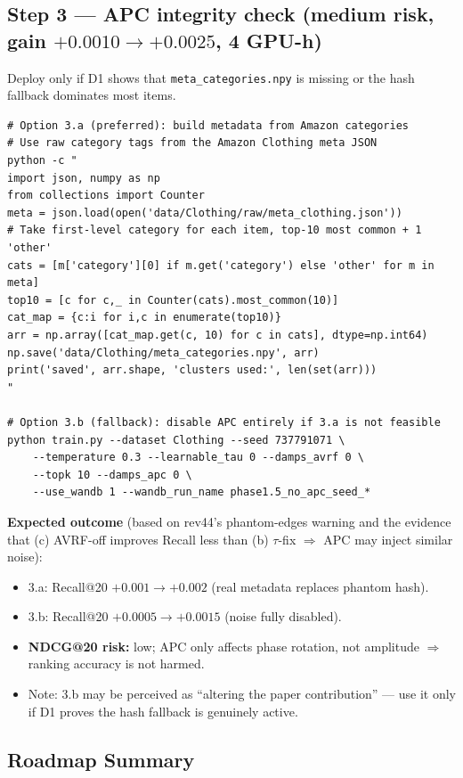 \documentclass[11pt,a4paper]{article}
\begin{document}
\subsection*{Step 3 --- APC integrity check (medium risk, gain $+0.0010 \to +0.0025$, 4 GPU-h)}

Deploy only if D1 shows that \texttt{meta\_categories.npy} is missing or the
hash fallback dominates most items.

\begin{lstlisting}[style=bashstyle]
# Option 3.a (preferred): build metadata from Amazon categories
# Use raw category tags from the Amazon Clothing meta JSON
python -c "
import json, numpy as np
from collections import Counter
meta = json.load(open('data/Clothing/raw/meta_clothing.json'))
# Take first-level category for each item, top-10 most common + 1 'other'
cats = [m['category'][0] if m.get('category') else 'other' for m in meta]
top10 = [c for c,_ in Counter(cats).most_common(10)]
cat_map = {c:i for i,c in enumerate(top10)}
arr = np.array([cat_map.get(c, 10) for c in cats], dtype=np.int64)
np.save('data/Clothing/meta_categories.npy', arr)
print('saved', arr.shape, 'clusters used:', len(set(arr)))
"

# Option 3.b (fallback): disable APC entirely if 3.a is not feasible
python train.py --dataset Clothing --seed 737791071 \
    --temperature 0.3 --learnable_tau 0 --damps_avrf 0 \
    --topk 10 --damps_apc 0 \
    --use_wandb 1 --wandb_run_name phase1.5_no_apc_seed_*
\end{lstlisting}

\textbf{Expected outcome} (based on rev44's phantom-edges warning and the
evidence that (c) AVRF-off improves Recall less than (b) $\tau$-fix
$\Rightarrow$ APC may inject similar noise):
\begin{itemize}[leftmargin=*]
    \item 3.a: Recall@20 $+0.001 \to +0.002$ (real metadata replaces phantom hash).
    \item 3.b: Recall@20 $+0.0005 \to +0.0015$ (noise fully disabled).
    \item \textbf{NDCG@20 risk:} low; APC only affects phase rotation, not amplitude $\Rightarrow$ ranking accuracy is not harmed.
    \item Note: 3.b may be perceived as ``altering the paper contribution'' --- use it only if D1 proves the hash fallback is genuinely active.
\end{itemize}

\subsection*{Roadmap Summary}
\end{document}
